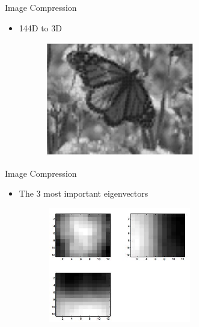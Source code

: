 \documentclass[serif, aspectratio=169]{beamer}
\begin{document}
\begin{frame}{Image Compression}
      \begin{itemize}
          \item 144D to 3D
      \end{itemize}
        \begin{figure}[htpb]
            \begin{center}
                \includegraphics[width=8cm, height=5cm]{pic/3d.JPG}
            \end{center}
        \end{figure}
\end{frame}


\begin{frame}{Image Compression}
      \begin{itemize}
          \item The 3 most important eigenvectors
      \end{itemize}
        \begin{figure}[htpb]
            \begin{center}
                \includegraphics[width=8cm, height=5cm]{pic/3_most.JPG}
            \end{center}
        \end{figure}
\end{frame}
\end{document}
